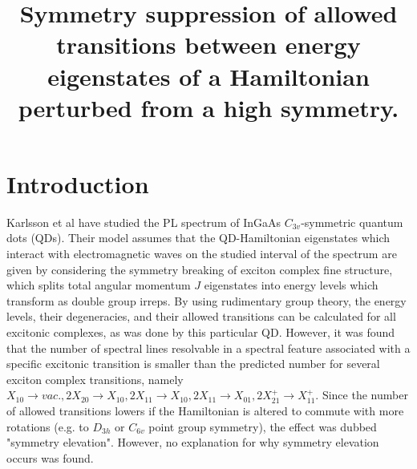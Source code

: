 \documentclass[12pt]{article}
\begin{document}
	\title{Symmetry suppression of allowed transitions between energy eigenstates of a Hamiltonian perturbed from a high symmetry.}	
	\maketitle
	
	
	\section{Introduction}
	Karlsson et al \cite{karlsson} have studied the PL spectrum of InGaAs $C_{3v}$-symmetric quantum dots (QDs). Their model assumes that the QD-Hamiltonian eigenstates which interact with electromagnetic waves on the studied interval of the spectrum are given by considering the symmetry breaking of exciton complex fine structure, which splits total angular momentum $J$ eigenstates into energy levels which transform as double group irreps. By using rudimentary group theory, the energy levels, their degeneracies, and their allowed transitions can be calculated for all excitonic complexes, as was done by this particular QD. However, it was found that the number of spectral lines resolvable in a spectral feature associated with a specific excitonic transition is smaller than the predicted number for several exciton complex transitions, namely $X_{10}\to vac., 2X_{20}\to X_{10},2X_{11}\to X_{10}, 2X_{11}\to X_{01}, 2X^+_{21}\to X^+_{11}$. Since the number of allowed transitions lowers if the Hamiltonian is altered to commute with more rotations (e.g. to $D_{3h}$ or $C_{6v}$ point group symmetry), the effect was dubbed "symmetry elevation". However, no explanation for why symmetry elevation occurs was found.
	
\end{document}
